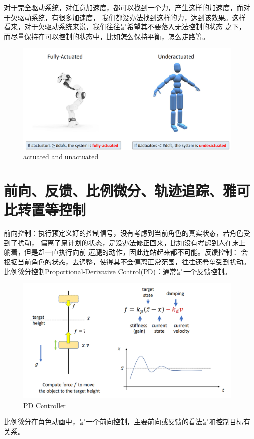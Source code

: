 \documentclass[lang=cn,newtx,10pt,scheme=chinese]{elegantbook}
\begin{document}
对于完全驱动系统，对任意加速度，都可以找到一个力，产生这样的加速度，而对于欠驱动系统，有很多加速度，
我们都没办法找到这样的力，达到该效果。这样看来，对于欠驱动系统来说，我们往往是希望其不要落入无法控制的状态
之下，而尽量保持在可以控制的状态中，比如怎么保持平衡，怎么走路等。
\begin{figure}[htbp]
  \centering
  \includegraphics[totalheight=1.5in]{"./image/actuatedun.png"}
  \caption{actuated and unactuated} \label{fig:actuatedun}
\end{figure}

\section{前向、反馈、比例微分、轨迹追踪、雅可比转置等控制}
前向控制：执行预定义好的控制信号，没有考虑到当前角色的真实状态，若角色受到了扰动，
偏离了原计划的状态，是没办法修正回来，比如没有考虑到人在床上躺着，但是却一直执行向前
迈腿的动作，因此连站起来都不可能。反馈控制：
会根据当前角色的状态，去调整，使得其不会偏离正常范围，往往还希望受到扰动。
比例微分控制Proportional-Derivative Control(PD)：通常是一个反馈控制。
\begin{figure}[htbp]
  \centering
  \includegraphics[totalheight=1.5in]{"./image/PDController.png"}
  \caption{PD Controller} \label{fig:PDController}
\end{figure}
比例微分在角色动画中，是一个前向控制，主要前向或反馈的看法是和控制目标有关系。
\end{document}

